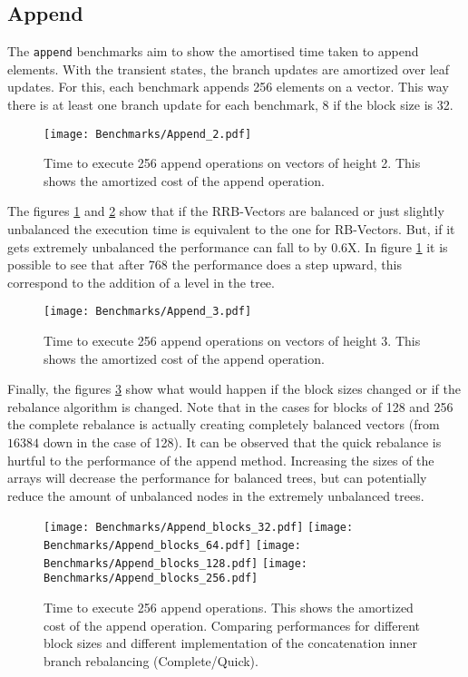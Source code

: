 \subsection{Append}
The \texttt{append} benchmarks aim to show the amortised time taken to append elements. With the transient states, the branch updates are amortized over leaf updates. For this, each benchmark appends 256 elements on a vector. This way there is at least one branch update for each benchmark, 8 if the block size is 32.

\begin{figure}[h!]
  \centering
  \texttt{[image: Benchmarks/Append\_2.pdf]}
  \caption{Time to execute 256 append operations on vectors of height 2. This shows the amortized cost of the append operation.}
  \label{Append2Benchmarks}
\end{figure}

The figures \ref{Append2Benchmarks} and \ref{Append3Benchmarks} show that if the RRB-Vectors are balanced or just slightly unbalanced the execution time is equivalent to the one for RB-Vectors. But, if it gets extremely unbalanced the performance can fall to by 0.6X. In figure \ref{Append2Benchmarks} it is possible to see that after 768 the performance does a step upward, this correspond to the addition of a level in the tree.

\begin{figure}[h!]
  \centering
  \texttt{[image: Benchmarks/Append\_3.pdf]}
  \caption{Time to execute 256 append operations on vectors of height 3. This shows the amortized cost of the append operation.}
   \label{Append3Benchmarks}
\end{figure}

\FloatBarrier

Finally, the figures \ref{AppendBlocksBenchmarks} show what would happen if the block sizes changed or if the rebalance algorithm is changed. Note that in the cases for blocks of 128 and 256 the complete rebalance is actually creating completely balanced vectors (from $16384$ down in the case of 128). It can be observed that the quick rebalance is hurtful to the performance of the append method. Increasing the sizes of the arrays will decrease the performance for balanced trees, but can potentially reduce the amount of unbalanced nodes in the extremely unbalanced trees.

\begin{figure}[h!]
  \centering
  \texttt{[image: Benchmarks/Append\_blocks\_32.pdf]}
  \texttt{[image: Benchmarks/Append\_blocks\_64.pdf]}
  \texttt{[image: Benchmarks/Append\_blocks\_128.pdf]}
  \texttt{[image: Benchmarks/Append\_blocks\_256.pdf]}
  \caption{Time to execute 256 append operations. This shows the amortized cost of the append operation. Comparing performances for different block sizes and different implementation of the concatenation inner branch rebalancing (Complete/Quick).}
  \label{AppendBlocksBenchmarks}
\end{figure}



